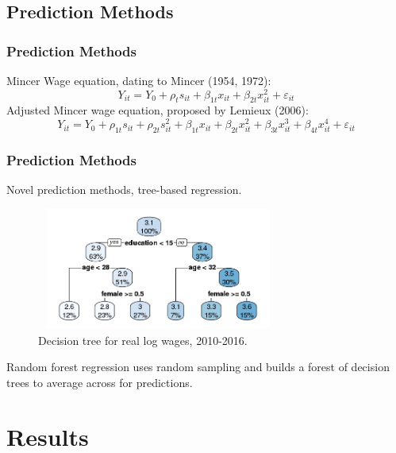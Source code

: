 \documentclass{beamer}
\begin{document}

\subsection{Prediction Methods}
\begin{frame}
\frametitle{Prediction Methods}
\pause
Mincer Wage equation, dating to Mincer (1954, 1972):
\begin{equation}
Y_{it}  = Y_0 + \rho_t s_{it} +\beta_{1t} x_{it} + \beta_{2t} x_{it}^2 + \varepsilon_{it}
\end{equation}
\pause 
Adjusted Mincer wage equation, proposed by Lemieux (2006):
\begin{equation}
Y_{it}  = Y_0 + \rho_{1t} s_{it} + \rho_{2t} s_{it}^2 + \beta_{1t} x_{it} + \beta_{2t} x_{it}^2 + \beta_{3t} x_{it}^3 + \beta_{4t} x_{it}^4 + \varepsilon_{it}
\end{equation}
\end{frame}

\begin{frame}
\frametitle{Prediction Methods}
Novel prediction methods, tree-based regression.
\pause
\begin{figure}
  \centering
  \caption{Decision tree for real log wages, 2010-2016.}
  \includegraphics[width=8cm, height=4cm]{Rpat2010_2016.png}
\end{figure}
\pause
Random forest regression uses random sampling and builds a forest of decision trees to average across for predictions.
\end{frame}

\section{Results}
\end{document}
